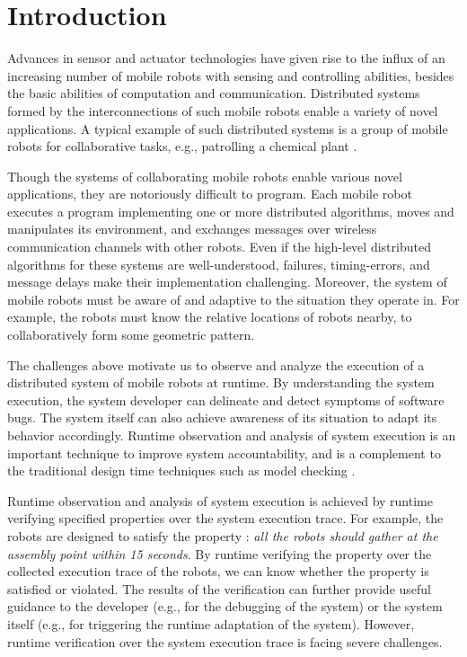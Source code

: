 \documentclass[10pt,conference,compsocconf,letterpaper]{IEEEtran}
\begin{document}
\IEEEpeerreviewmaketitle

\section{Introduction} \label{sec:Introduction}

Advances in sensor and actuator technologies have given rise to the influx of an increasing number of mobile robots with sensing and controlling abilities, besides the basic abilities of computation and communication. Distributed systems formed by the interconnections of such mobile robots enable a variety of novel applications. A typical example of such distributed systems is a group of mobile robots for collaborative tasks, e.g., patrolling a chemical plant \cite{Zhan13, Duggirala12, Yang15}.

Though the systems of collaborating mobile robots enable various novel applications, they are notoriously difficult to program. Each mobile robot executes a program implementing one or more distributed algorithms, moves and manipulates its environment, and exchanges messages over wireless communication channels with other robots. Even if the high-level distributed algorithms for these systems are well-understood, failures, timing-errors, and message delays make their implementation challenging. Moreover, the system of mobile robots must be aware of and adaptive to the situation they operate in. For example, the robots must know the relative locations of robots nearby, to collaboratively form some geometric pattern.

The challenges above motivate us to observe and analyze the execution of a distributed system of mobile robots at runtime. By understanding the system execution, the system developer can delineate and detect symptoms of software bugs. The system itself can also achieve awareness of its situation to adapt its behavior accordingly. Runtime observation and analysis of system execution is an important technique to improve system accountability, and is a complement to the traditional design time techniques such as model checking \cite{Baier08}.

Runtime observation and analysis of system execution is achieved by runtime verifying specified properties over the system execution trace. For example, the robots are designed to satisfy the property : \textit{all the robots should gather at the assembly point within 15 seconds}. By runtime verifying the property over the collected execution trace of the robots, we can know whether the property is satisfied or violated. The results of the verification can further provide useful guidance to the developer (e.g., for the debugging of the system) or the system itself (e.g., for triggering the runtime adaptation of the system). However, runtime verification over the system execution trace is facing severe challenges.
\end{document}
